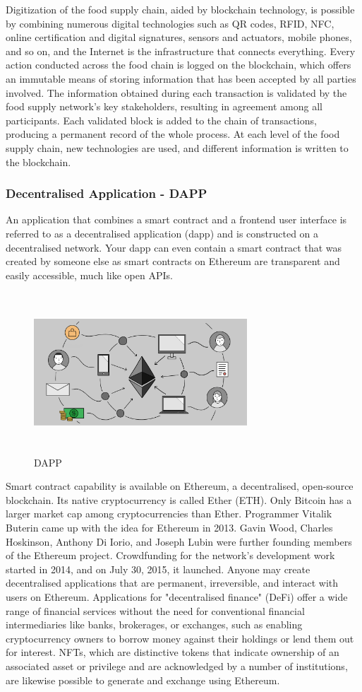 \documentclass[12pt,a4paper,twocolumn,fleqn]{article}
\begin{document}
Digitization of the food supply chain, aided by blockchain technology, is possible by combining numerous digital technologies such as QR codes, RFID, NFC, online certification and digital signatures, sensors and actuators, mobile phones, and so on, and the Internet is the infrastructure that connects everything. Every action conducted across the food chain is logged on the blockchain, which offers an immutable means of storing information that has been accepted by all parties involved. The information obtained during each transaction is validated by the food supply network's key stakeholders, resulting in agreement among all participants. Each validated block is added to the chain of transactions, producing a permanent record of the whole process. At each level of the food supply chain, new technologies are used, and different information is written to the blockchain.
\subsubsection{Decentralised Application - DAPP}
An application that combines a smart contract and a frontend user interface is referred to as a decentralised application (dapp) and is constructed on a decentralised network. Your dapp can even contain a smart contract that was created by someone else as smart contracts on Ethereum are transparent and easily accessible, much like open APIs.
\begin{figure} [H]
\includegraphics[width=8cm,height=6cm]{media/DAPP.png}
\centering
\caption{DAPP}
\end{figure}
Smart contract capability is available on Ethereum, a decentralised, open-source blockchain. Its native cryptocurrency is called Ether (ETH). Only Bitcoin has a larger market cap among cryptocurrencies than Ether. Programmer Vitalik Buterin came up with the idea for Ethereum in 2013. Gavin Wood, Charles Hoskinson, Anthony Di Iorio, and Joseph Lubin were further founding members of the Ethereum project. Crowdfunding for the network's development work started in 2014, and on July 30, 2015, it launched. Anyone may create decentralised applications that are permanent, irreversible, and interact with users on Ethereum. Applications for "decentralised finance" (DeFi) offer a wide range of financial services without the need for conventional financial intermediaries like banks, brokerages, or exchanges, such as enabling cryptocurrency owners to borrow money against their holdings or lend them out for interest. NFTs, which are distinctive tokens that indicate ownership of an associated asset or privilege and are acknowledged by a number of institutions, are likewise possible to generate and exchange using Ethereum.
\end{document}

